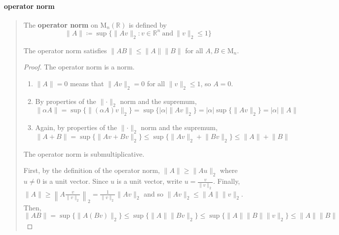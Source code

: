 \documentclass[letterpaper, 10pt]{article}
\theoremstyle{theostyle}
\begin{document}
\paragraph{operator norm}
\begin{quote}
    The \textbf{operator norm} on \(\mathrm{M}_n (\mathbb{R})\) is defined by
    \[\lVert A \rVert \coloneqq \sup \bigl\{\lVert A v \rVert_2 : v \in \mathbb{R}^n \ \text{and} \ \lVert v \rVert_2 \leq 1 \bigr\}\]

    The operator norm satisfies \(\lVert AB \rVert \leq \lVert A \rVert \lVert B \rVert\) for all \(A, B \in \mathrm{M}_n\).

    \begin{proof}
        The operator norm is a norm.
        \begin{enumerate}
            \item \(\lVert A \rVert = 0\) means that \(\lVert Av\rVert_2 = 0\) for all \(\lVert v\rVert_2 \leq 1\), so \(A = 0\). 
            \item By properties of the \(\lVert \cdot \rVert_2 \) norm and the supremum,
            \[\lVert \alpha A \rVert  = \sup \bigl\{\lVert (\alpha A) v \rVert_2 \bigr\} = \sup \bigl\{\lvert \alpha \rvert \lVert A v \rVert_2 \bigr\}
             = \lvert \alpha \rvert \sup \bigl\{\lVert A v \rVert_2 \bigr\} = \lvert \alpha \rvert \lVert A \rVert\]
            \item Again, by properties of the \(\lVert \cdot \rVert_2 \) norm and the supremum,
            \[\lVert A +  B \rVert = \sup \bigl\{\lVert A v + B v \rVert_2 \bigr\} \leq 
            \sup \bigl\{\lVert A v \rVert_2 + \lVert B v \rVert_2 \bigr\} \leq \lVert A \rVert + \lVert B \rVert\]
        \end{enumerate}
        The operator norm is submultiplicative.

        First, by the definition of the operator norm, \(\lVert A \rVert \geq \lVert A u \rVert_2\) where \(u \neq 0\) is a unit vector.
        Since \(u\) is a unit vector, write \(u = \frac{v}{\lVert v \rVert_2}\).
        Finally, \(\lVert A \rVert \geq \left\lVert A \frac{v}{\lVert v \rVert_2} \right\rVert_2 = \frac{1}{\lVert v \rVert_2} \lVert A v \rVert_2\) and so
        \(\lVert A v \rVert_2 \leq \lVert A \rVert \lVert v \rVert_2\).
        Then, 
        \[\lVert AB \rVert = \sup \bigl\{ \lVert A(Bv) \rVert_2 \bigr\} \leq \sup \bigl\{\lVert A \rVert \lVert Bv \rVert_2 \bigr\}
        \leq \sup \bigl\{\lVert A \rVert \lVert B \rVert \lVert v \rVert_2 \bigr\} \leq \lVert A \rVert \lVert B \rVert \]
    \end{proof}
\end{quote}
\end{document}
